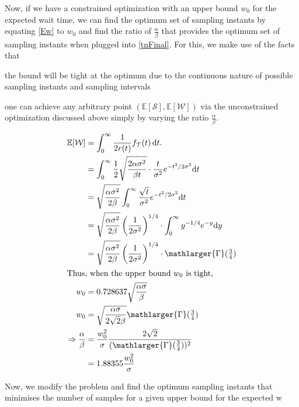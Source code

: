 Now, if we have a constrained optimization with an upper bound $w_0$ for the expected wait time, we can find the optimum set of sampling instants by equating \cref{Ew} to $w_0$ and find the ratio of $\frac{\alpha}{\beta}$ that provides the optimum set of sampling instants when plugged into \cref{tnFinal}.
For this, we make use of the facts that
\begin{enumerate*}[itemjoin={{, }}, itemjoin*={{, and }}]
    \item the bound will be tight at the optimum due to the continuous nature of possible sampling instants and sampling intervals
    \item one can achieve any arbitrary point $(\mathbb{E}[\mathcal{S}],\mathbb{E}[\mathcal{W}])$ via the unconstrained optimization discussed above simply by varying the ratio $\frac{\alpha}{\beta}$.
\end{enumerate*}
\begin{alignat*}{1}
\mathbb{E}[\mathcal{W}]&=\int_{0}^{\infty}\dfrac{1}{2r(t)}f_\mathcal{T}(t)\,\mathrm{d}t.\nonumber\\
&=\int_{0}^{\infty}\frac{1}{2}\sqrt{\frac{2\alpha\sigma^2}{\beta t}}\cdot \frac{t}{\sigma^2}e^{-{t^2}/{2\sigma^2}}\mathrm{d}t\\
&=\sqrt{\frac{\alpha\sigma^2}{2\beta}}\int_{0}^{\infty}\frac{\sqrt{t}}{\sigma^2}e^{-{t^2}/{2\sigma^2}}\mathrm{d}t\\
&=\sqrt{\frac{\alpha\sigma^2}{2\beta}}\left({\frac{1}{{2}\sigma^2}}\right)^{1/4}\cdot\int_{0}^{\infty}y^{-1/4}e^{-y}\mathrm{d}y\\
&=\sqrt{\frac{\alpha\sigma^2}{2\beta}}\left({\frac{1}{{2}\sigma^2}}\right)^{1/4}\cdot\mathlarger{\Gamma}(\tfrac{3}{4})\\
\intertext{Thus, when the upper bound $w_0$ is tight,}
w_0&=0.728637\sqrt{\frac{\alpha\sigma}{\beta}}\\
w_0&=\sqrt{\frac{\alpha\sigma}{2\sqrt{2}\beta}}\mathlarger{\Gamma}(\tfrac{3}{4})\\
\Rightarrow\frac{\alpha}{\beta}&=\frac{w_0^2}{\sigma}\frac{2\sqrt{2}}{(\mathlarger{\Gamma}(\tfrac{3}{4}))^2}\\&=1.88355\frac{w_0^2}{\sigma}
\end{alignat*}

Now, we modify the problem and find the optimum sampling instants that minimises the number of samples for a given upper bound for the expected w